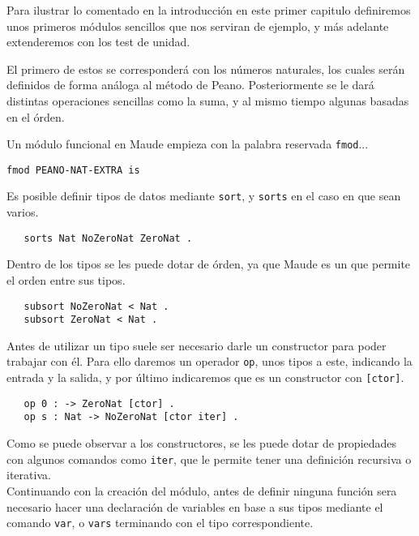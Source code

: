 
Para ilustrar lo comentado en la introducción en este primer capitulo definiremos unos primeros módulos sencillos que nos serviran de ejemplo, y más adelante extenderemos con los test de unidad. \par
El primero de estos se corresponderá con los números naturales, los cuales ser\'an definidos de forma análoga al método de Peano. Posteriormente se le dará distintas operaciones sencillas como la suma, y al mismo tiempo algunas basadas en el órden.\par

Un módulo funcional en Maude empieza con la palabra reservada \texttt{fmod}...

{\codesize
\begin{verbatim}
fmod PEANO-NAT-EXTRA is
\end{verbatim}
}

Es posible definir tipos de datos mediante \texttt{sort}, y \texttt{sorts} en el caso en que sean varios.

{\codesize
\begin{verbatim}
   sorts Nat NoZeroNat ZeroNat .
\end{verbatim}
}

Dentro de los tipos se les puede dotar de órden, ya que Maude es un que permite el orden entre sus tipos. \par

{\codesize
\begin{verbatim}
   subsort NoZeroNat < Nat .
   subsort ZeroNat < Nat .
\end{verbatim}
}

Antes de utilizar un tipo suele ser necesario darle un constructor para poder trabajar con él. Para ello daremos un operador \texttt{op}, unos tipos a este, indicando la entrada y la salida, y por último indicaremos que es un constructor con \texttt{[ctor]}. \par

{\codesize
\begin{verbatim}
   op 0 : -> ZeroNat [ctor] .
   op s : Nat -> NoZeroNat [ctor iter] .
\end{verbatim}
}

Como se puede observar a los constructores, se les puede dotar de propiedades con algunos comandos como \texttt{iter}, que le permite tener una definición recursiva o iterativa. \\

Continuando con la creación del módulo, antes de definir ninguna función sera necesario hacer una declaración de variables en base a sus tipos mediante el comando \texttt{var}, o \texttt{vars} terminando con el tipo correspondiente. 

